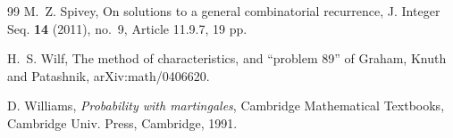 \documentclass[10pt]{amsart}
\theoremstyle{definition}
\theoremstyle{remark}
\begin{document}
\begin{thebibliography}{99}
M.~Z. Spivey, On solutions to a general combinatorial recurrence, J. Integer Seq. {\bf 14} (2011), no.~9, Article 11.9.7, 19 pp.


H.~S. Wilf, The method of characteristics, and ``problem 89'' of Graham, Knuth and Patashnik, arXiv:math/0406620. %


D. Williams, {\it Probability with martingales}, Cambridge Mathematical Textbooks, Cambridge Univ. Press, Cambridge, 1991.

\end{thebibliography}
\end{document}
